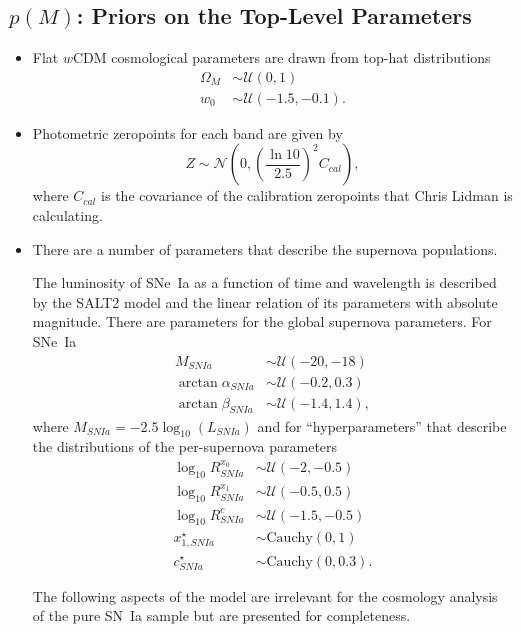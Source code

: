 \documentclass[preprint,3p]{elsarticle}
\begin{document}
\subsection{$p(M)$: Priors on the Top-Level Parameters}
\begin{itemize}
\item
Flat $w$CDM cosmological parameters are drawn from top-hat distributions
\begin{align}
\Omega_M & \sim  {\mathcal{U}}(0,1)\\
w_0 & \sim \mathcal{U}(-1.5, -0.1).
\end{align}

\item
Photometric zeropoints for each band are given by
\begin{equation}
Z \sim \mathcal{N}\left(0,\left(\frac{\ln{10}}{2.5}\right)^2 C_{cal}\right),
\end{equation}
where $C_{cal}$ is the covariance of the calibration zeropoints that Chris Lidman is calculating.

\item
There are a number of parameters that describe the supernova populations.

The luminosity of SNe~Ia as a function of time and wavelength is described by the SALT2 model and
the linear relation of its parameters with absolute magnitude.
There are parameters for the global supernova parameters.  For SNe~Ia
\begin{align}
M_{SNIa} & \sim \mathcal{U}(-20, -18) \\
\arctan{\alpha_{SNIa}} & \sim \mathcal{U}(-0.2, 0.3) \\
\arctan{\beta_{SNIa}} & \sim \mathcal{U}(-1.4, 1.4),
\end{align}
where $M_{SNIa} = -2.5\log_{10}({L_{SNIa}})$
and for ``hyperparameters'' that describe the distributions of the per-supernova parameters
\begin{align}
\log_{10}{R^{x_0}_{SNIa}} & \sim \mathcal{U}({-2}, {-0.5})\\
\log_{10}{R^{x_1}_{SNIa}} & \sim \mathcal{U}({-0.5}, {0.5})\\
\log_{10}{R^{c}_{SNIa}} & \sim \mathcal{U}({-1.5}, {-0.5})\\
x_{1,SNIa}^\star& \sim \text{Cauchy}(0,1)\\
c^\star_{SNIa} & \sim \text{Cauchy}(0,0.3).
\end{align}

The following aspects of the model are irrelevant for the cosmology analysis of the pure SN~Ia sample
but are presented for completeness.


\end{itemize}
\end{document}
